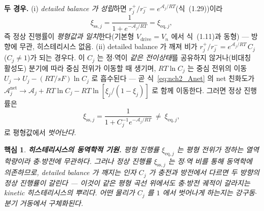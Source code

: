 \documentclass[11pt,a4paper]{article}
\newtheorem*{keybox}{핵심}
\newcommand{\eq}{\mathrm{eq}}
\newcommand{\drive}{\mathrm{drive}}
\newcommand{\sstat}{\mathrm{ss}}
\begin{document}
\textbf{두 경우.} (i) \emph{detailed balance 가 성립}하면 $r_j^+/r_j^-=e^{\mathcal A_j/RT}$(식~(1.29))이라
\begin{equation}
\xi_{\sstat,j}=\frac{1}{1+e^{-\mathcal A_j/RT}}=\xi_{\eq,j},
\label{eq:nch2_ss_eq}
\end{equation}
즉 정상 진행률이 \emph{평형값과 일치}한다(기본형 $V_\drive=V_n$ 에서 식~(1.11)과 동형) — 방향에 무관,
히스테리시스 없음. (ii) detailed balance 가 깨져 비가 $r_j^+/r_j^-=e^{\mathcal A_j/RT}\,C_j$ ($C_j\ne1$)가 되는
경우다. 이 $C_j$ 는 정$\cdot$역이 \emph{같은 전이상태}를 공유하지 않거나(비대칭 활성도) 분기에 따라 중심 전위가
이동할 때 생기며, $RT\ln C_j$ 는 중심 전위의 이동 $U_j\to U_j-(RT/sF)\ln C_j$ 로 흡수된다 — 곧 식~\eqref{eq:nch2_Anet}
의 net 친화도가 $\mathcal A_j^{\mathrm{net}}\to\mathcal A_j+RT\ln C_j-RT\ln[\xi_j/(1-\xi_j)]$ 로 함께 이동한다.
그러면 정상 진행률은
\begin{equation}
\xi_{\sstat,j}=\frac{1}{1+C_j^{-1}e^{-\mathcal A_j/RT}}\ \ne\ \xi_{\eq,j},
\label{eq:nch2_ss_neq}
\end{equation}
로 평형값에서 \emph{벗어난다}.

\begin{keybox}
\textbf{히스테리시스의 동역학적 기원.} 평형 진행률 $\xi_{\eq,j}$ 는 평형 전위가 정하는 열역학량이라 충$\cdot$방전에
무관하다. 그러나 정상 진행률 $\xi_{\sstat,j}$ 는 정$\cdot$역 비를 통해 \emph{동역학}에 의존하므로, detailed balance
가 깨지는 인자 $C_j$ 가 충전과 방전에서 다르면 두 방향의 정상 진행률이 갈린다 — 이것이 같은 평형 곡선 위에서도
충$\cdot$방전 궤적이 갈라지는 \emph{kinetic 히스테리시스}의 뿌리다. 어떤 물리가 $C_j$ 를 $1$ 에서 벗어나게
하는지는 강구동$\cdot$분기 거동에서 구체화된다.
\end{keybox}

\end{document}
